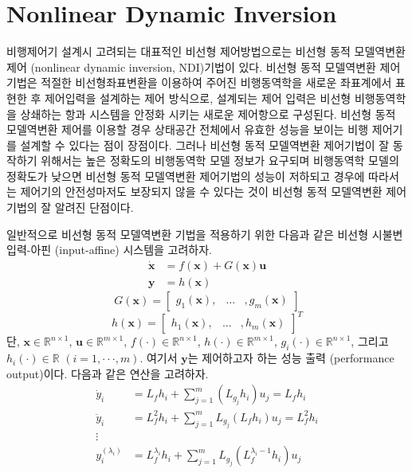 \documentclass[a4paper, 12pt]{report}
\begin{document}
	\section{Nonlinear Dynamic Inversion}
	비행제어기 설계시 고려되는 대표적인 비선형 제어방법으로는 비선형 동적 모델역변환 제어 (nonlinear dynamic inversion, NDI)기법이 있다. 비선형 동적 모델역변환 제어 기법은 적절한 비선형좌표변환을 이용하여 주어진 비행동역학을 새로운 좌표계에서 표현한 후 제어입력을 설계하는 제어 방식으로, 설계되는 제어 입력은 비선형 비행동역학을 상쇄하는 항과 시스템을 안정화 시키는 새로운 제어항으로 구성된다. 비선형 동적 모델역변환 제어를 이용할 경우 상태공간 전체에서 유효한 성능을 보이는 비행 제어기를 설계할 수 있다는 점이 장점이다. 그러나 비선형 동적 모델역변환 제어기법이 잘 동작하기 위해서는 높은 정확도의 비행동역학 모델 정보가 요구되며 비행동역학 모델의 정확도가 낮으면 비선형 동적 모델역변환 제어기법의 성능이 저하되고 경우에 따라서는 제어기의 안전성마저도 보장되지 않을 수 있다는 것이 비선형 동적 모델역변환 제어기법의 잘 알려진 단점이다. \par
일반적으로 비선형 동적 모델역변환 기법을 적용하기 위한 다음과 같은 비선형 시불변 입력-아핀 (input-affine) 시스템을 고려하자.
\begin{equation}\label{Eq:NDI_sys}
  \begin{split}
    \dot{\mathbf{x}} &= f(\mathbf{x}) + G(\mathbf{x})\mathbf{u} \\
    \mathbf{y} &= h(\mathbf{x})
  \end{split}
\end{equation}
\begin{equation}\label{Eq:InputMTRX}
  G(\mathbf{x}) =
  \begin{bmatrix}
    g_{1}(\mathbf{x}), & \dots & ,g_{m}(\mathbf{x})
  \end{bmatrix}
\end{equation}
\begin{equation}\label{Eq:outputMTRX}
  h(\mathbf{x}) =
  \begin{bmatrix}
    h_{1}(\mathbf{x}), & \dots & ,h_{m}(\mathbf{x})
  \end{bmatrix}^{T}
\end{equation}
단, $\mathbf{x} \in \mathbb{R}^{n\times1}$, $\mathbf{u} \in \mathbb{R}^{m\times1}$, $f(\cdot) \in \mathbb{R}^{n\times1}$, $h(\cdot) \in \mathbb{R}^{m\times1}$, $g_{i}(\cdot) \in \mathbb{R}^{n\times1}$, 그리고 $h_{i}(\cdot) \in \mathbb{R}\,\,(i=1,\cdot\cdot\cdot,m)$. 여기서 $\mathbf{y}$는 제어하고자 하는 성능 출력 (performance output)이다. 다음과 같은 연산을 고려하자.
\begin{equation}\label{Eq:output_dere}
  \begin{split}
    \dot{y}_{i} &= L_{f}h_{i} + \sum_{j=1}^{m}( L_{g_{j}}h_{i} )u_{j} = L_{f}h_{i} \\
    \ddot{y}_{i} &= L_{f}^{2}h_{i} + \sum_{j=1}^{m}L_{g_{j}}( L_{f}h_{i} )u_{j} = L_{f}^{2}h_{i} \\
     \vdots  \\
    y_{i}^{(\lambda_{i})} &= L_{f}^{\lambda_{i}}h_{i} + \sum_{j=1}^{m}L_{g_{j}}( L_{f}^{\lambda_{i}-1}h_{i} )u_{j}
  \end{split}
\end{equation}
\end{document}
